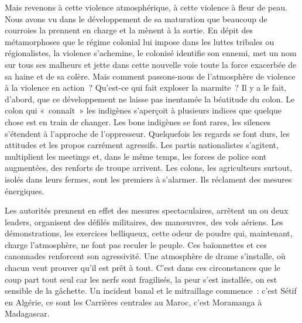 \documentclass[french,twoside]{book} %
\begin{document}
 Mais revenons à cette violence atmosphérique, à cette violence à fleur de peau. Nous avons vu dans le développement de sa maturation que beaucoup de courroies la prennent en charge et la mènent à la sortie. En dépit des métamorphoses que le régime colonial lui impose dans les luttes tribales ou régionalistes, la violence s’achemine, le colonisé identifie son ennemi, met un nom sur tous ses malheurs et jette dans cette nouvelle voie toute la force exacerbée de sa haine et de sa colère. Mais comment passons-nous de l’atmosphère de violence à la violence en action ? Qu’est-ce qui fait exploser la marmite ? Il y a le fait, d’abord, que ce développement ne laisse pas inentamée la béatitude du colon. Le colon qui « connaît » les indigènes s’aperçoit à plusieurs indices que quelque chose est en train de changer. Les bons indigènes se font rares, les silences s’étendent à l’approche de l’oppresseur. Quelquefois les regards se font durs, les attitudes et les propos carrément agressifs. Les partis nationalistes s’agitent, multiplient les meetings et, dans le même temps, les forces de police sont augmentées, des renforts de troupe arrivent. Les colons, les agriculteurs surtout, isolés dans leurs fermes, sont les premiers à s’alarmer. Ils réclament des mesures énergiques.\par
Les autorités prennent en effet des mesures spectaculaires, arrêtent un ou deux leaders, organisent des défilés militaires, des manœuvres, des vols aériens. Les démonstrations, les exercices belliqueux, cette odeur de poudre qui, maintenant, charge l’atmosphère, ne font pas reculer le peuple. Ces baïonnettes et ces canonnades renforcent son agressivité. Une atmosphère de drame s’installe, où chacun veut prouver qu’il est prêt à tout. C’est dans ces circonstances que le coup part tout seul car les nerfs sont fragilisés, la peur s’est installée, on est sensible de la gâchette. Un incident banal et le mitraillage commence : c’est Sétif en Algérie, ce sont les Carrières centrales au Maroc, c’est Moramanga à Madagascar.\par
\bigbreak
\end{document}
